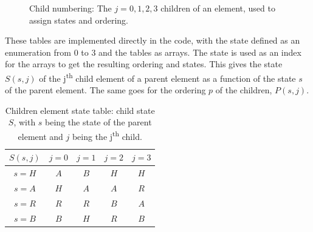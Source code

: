\begin{figure}[H]
    \centering
    
    \caption{Child numbering: The \(j = 0, 1, 2, 3\) children of an element, used to assign states and ordering.}\label{fig:child_order}
\end{figure}

\noindent
These tables are implemented directly in the code, with the state defined as an enumeration from 0
to 3 and the tables as arrays. The state is used as an index for the arrays to get the resulting
ordering and states. This gives the state \(S(s, j)\) of the j\textsuperscript{th} child element of
a parent element as a function of the state \(s\) of the parent element. The same goes for the
ordering \(p\) of the children, \(P(s, j)\).

\begin{table}[H]
    \begin{center}
        \begin{tabular}{ c | c c c c} 
            \(S( s, j )\) & \(j = 0\) & \(j = 1\) & \(j = 2\) & \(j = 3\)  \\
            \hline
            \(s = H\) & \textcolor{vs_red}{\(A\)} & \textcolor{vs_red}{\(B\)} & \textcolor{vs_red}{\(H\)} & \textcolor{vs_red}{\(H\)} \\ 
            \(s = A\) & \textcolor{vs_blue}{\(H\)} & \textcolor{vs_blue}{\(A\)} & \textcolor{vs_blue}{\(A\)} & \textcolor{vs_blue}{\(R\)} \\
            \(s = R\) & \textcolor{vs_teal}{\(R\)} & \textcolor{vs_teal}{\(R\)} & \textcolor{vs_teal}{\(B\)} & \textcolor{vs_teal}{\(A\)} \\
            \(s = B\) & \textcolor{vs_plum}{\(B\)} & \textcolor{vs_plum}{\(H\)} & \textcolor{vs_plum}{\(R\)} & \textcolor{vs_plum}{\(B\)} \\
        \end{tabular}
    
        \caption{Children element state table: child state \(S\), with \(s\) being the state of the parent element and \(j\) being the j\textsuperscript{th} child.}\label{table:children_state}
    \end{center}
\end{table}

